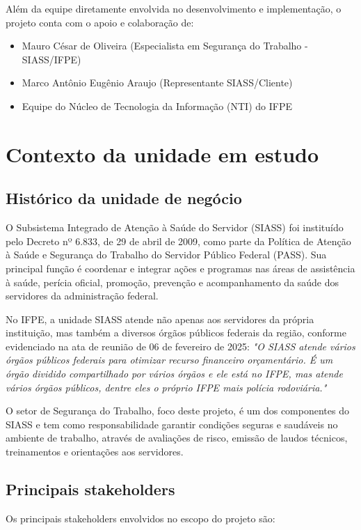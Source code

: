 \documentclass[12pt,a4paper]{article}
\begin{document}
Além da equipe diretamente envolvida no desenvolvimento e implementação, o projeto conta com o apoio e colaboração de:

\begin{itemize}
    \item Mauro César de Oliveira (Especialista em Segurança do Trabalho - SIASS/IFPE)
    \item Marco Antônio Eugênio Araujo (Representante SIASS/Cliente)
    \item Equipe do Núcleo de Tecnologia da Informação (NTI) do IFPE
\end{itemize}

\section{Contexto da unidade em estudo}

\subsection{Histórico da unidade de negócio}
O Subsistema Integrado de Atenção à Saúde do Servidor (SIASS) foi instituído pelo Decreto nº 6.833, de 29 de abril de 2009, como parte da Política de Atenção à Saúde e Segurança do Trabalho do Servidor Público Federal (PASS). Sua principal função é coordenar e integrar ações e programas nas áreas de assistência à saúde, perícia oficial, promoção, prevenção e acompanhamento da saúde dos servidores da administração federal.

No IFPE, a unidade SIASS atende não apenas aos servidores da própria instituição, mas também a diversos órgãos públicos federais da região, conforme evidenciado na ata de reunião de 06 de fevereiro de 2025: \textit{"O SIASS atende vários órgãos públicos federais para otimizar recurso financeiro orçamentário. É um órgão dividido compartilhado por vários órgãos e ele está no IFPE, mas atende vários órgãos públicos, dentre eles o próprio IFPE mais polícia rodoviária."} 

O setor de Segurança do Trabalho, foco deste projeto, é um dos componentes do SIASS e tem como responsabilidade garantir condições seguras e saudáveis no ambiente de trabalho, através de avaliações de risco, emissão de laudos técnicos, treinamentos e orientações aos servidores.

\subsection{Principais stakeholders}
Os principais stakeholders envolvidos no escopo do projeto são:
\end{document}
